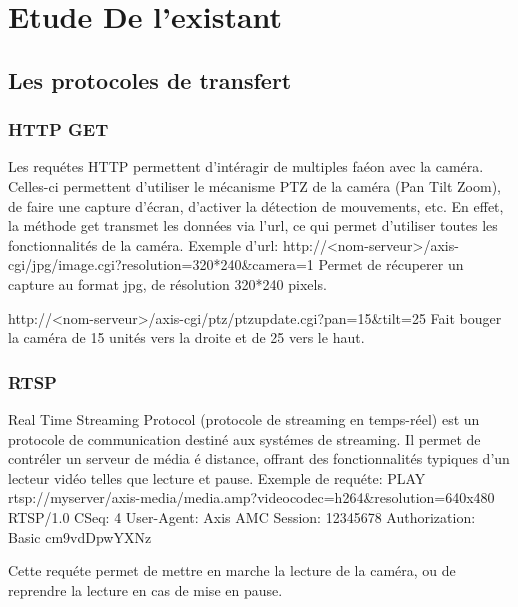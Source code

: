 \chapter{Etude De l'existant}
	\section{Les protocoles de transfert}
		\subsection{HTTP GET}
		Les requétes HTTP permettent d'intéragir de multiples faéon avec la caméra.
		Celles-ci permettent d'utiliser le mécanisme PTZ de la caméra (Pan Tilt
		Zoom), de faire une capture d'écran, d'activer la détection de mouvements,
		etc. 
		En effet, la méthode get transmet les données via l'url, ce qui permet
		d'utiliser toutes les fonctionnalités de la caméra. 
		Exemple d'url:
		http://<nom-serveur>/axis-cgi/jpg/image.cgi?resolution=320*240&camera=1
		Permet de récuperer un capture au format jpg, de résolution 320*240 pixels.
		
		http://<nom-serveur>/axis-cgi/ptz/ptzupdate.cgi?pan=15&tilt=25
		Fait bouger la caméra de 15 unités vers la droite et de 25 vers le haut.

		\subsection{RTSP}
		Real Time Streaming Protocol (protocole de streaming en temps-réel) est un
		protocole de communication destiné aux systémes de streaming. Il permet
		de contréler un serveur de média é distance, offrant des fonctionnalités
		typiques d'un lecteur vidéo telles que lecture et pause.
		Exemple de requéte:
		PLAY rtsp://myserver/axis-media/media.amp?videocodec=h264&resolution=640x480
		RTSP/1.0 CSeq: 4
		User-Agent: Axis AMC
		Session: 12345678
		Authorization: Basic cm9vdDpwYXNz
		
		Cette requéte permet de mettre en marche la lecture de la caméra, ou de
		reprendre la lecture en cas de mise en pause.
